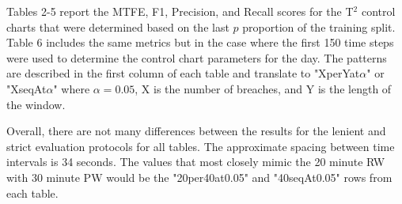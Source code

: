 \documentclass[12pt]{article}
\begin{document}
Tables 2-5 report the MTFE, F1, Precision, and Recall scores for the T$^2$ control charts that were determined based on the
last $p$ proportion of the training split. Table 6 includes the same metrics but in the case where the first 150 time steps
were used to determine the control chart parameters for the day. The patterns are described in the first column of each table
and translate to "XperYat$\alpha$" or "XseqAt$\alpha$" where $\alpha=0.05$, X is the number of breaches, and Y is the length
of the window.

Overall, there are not many differences between the results for the lenient and strict evaluation protocols for all tables.
The approximate spacing between time intervals is 34 seconds. The values that most closely mimic the 20 minute RW with 30
minute PW would be the "20per40at0.05" and "40seqAt0.05" rows from each table.
\end{document}
